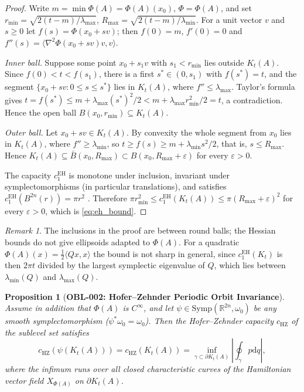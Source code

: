 \documentclass[11pt,a4paper,reqno]{amsart}
\newtheorem{proposition}[theorem]{Proposition}
\theoremstyle{definition}
\theoremstyle{remark}
\newtheorem{remark}[theorem]{Remark}
\numberwithin{equation}{section}
\newcommand{\dif}{\mathrm{d}}
\begin{document}
\begin{proof}
Write $m = \min\Phi(A) = \Phi(A)(x_0)$, $\Phi = \Phi(A)$, and set $r_{\min} = \sqrt{2(t - m)/\lambda_{\max}}$, $R_{\max} = \sqrt{2(t - m)/\lambda_{\min}}$. For a unit vector $v$ and $s \ge 0$ let $f(s) = \Phi(x_0 + s v)$; then $f(0) = m$, $f'(0) = 0$ and $f''(s) = \langle \nabla^2\Phi(x_0+sv)v, v\rangle$.

\emph{Inner ball.} Suppose some point $x_0 + s_1 v$ with $s_1 < r_{\min}$ lies outside $K_t(A)$. Since $f(0) < t < f(s_1)$, there is a first $s^* \in (0, s_1)$ with $f(s^*) = t$, and the segment $\{x_0 + sv : 0 \le s \le s^*\}$ lies in $K_t(A)$, where $f'' \le \lambda_{\max}$. Taylor's formula gives $t = f(s^*) \le m + \lambda_{\max}(s^*)^2/2 < m + \lambda_{\max} r_{\min}^2/2 = t$, a contradiction. Hence the open ball $B(x_0, r_{\min}) \subseteq K_t(A)$.

\emph{Outer ball.} Let $x_0 + s v \in K_t(A)$. By convexity the whole segment from $x_0$ lies in $K_t(A)$, where $f'' \ge \lambda_{\min}$, so $t \ge f(s) \ge m + \lambda_{\min} s^2/2$, that is, $s \le R_{\max}$. Hence $K_t(A) \subseteq \bar{B}(x_0, R_{\max}) \subset B(x_0, R_{\max} + \varepsilon)$ for every $\varepsilon > 0$.

The capacity $c_1^{\mathrm{EH}}$ is monotone under inclusion, invariant under symplectomorphisms (in particular translations), and satisfies $c_1^{\mathrm{EH}}(B^{2n}(r)) = \pi r^2$ \cite{EkelandHofer1989}. Therefore $\pi r_{\min}^2 \le c_1^{\mathrm{EH}}(K_t(A)) \le \pi (R_{\max} + \varepsilon)^2$ for every $\varepsilon > 0$, which is \eqref{eq:eh_bound}.
\end{proof}

\begin{remark}
The inclusions in the proof are between round balls; the Hessian bounds do not give ellipsoids adapted to $\Phi(A)$. For a quadratic $\Phi(A)(x) = \tfrac12\langle Qx, x\rangle$ the bound is not sharp in general, since $c_1^{\mathrm{EH}}(K_t)$ is then $2\pi t$ divided by the largest symplectic eigenvalue of $Q$, which lies between $\lambda_{\min}(Q)$ and $\lambda_{\max}(Q)$.
\end{remark}

\begin{proposition}[\textbf{OBL-002: Hofer--Zehnder Periodic Orbit Invariance}]
\label{prop:hz_symp_inv}
Assume in addition that $\Phi(A)$ is $C^\infty$, and let $\psi \in \mathrm{Symp}(\mathbb{R}^{2n}, \omega_0)$ be any smooth symplectomorphism ($\psi^* \omega_0 = \omega_0$). Then the Hofer--Zehnder capacity $c_{\mathrm{HZ}}$ of the sublevel set satisfies
\begin{equation}
c_{\mathrm{HZ}}(\psi(K_t(A))) = c_{\mathrm{HZ}}(K_t(A)) = \inf_{\gamma \subset \partial K_t(A)} \left| \oint_\gamma p \dif q \right|,
\end{equation}
where the infimum runs over all closed characteristic curves of the Hamiltonian vector field $X_{\Phi(A)}$ on $\partial K_t(A)$.
\end{proposition}
\end{document}
